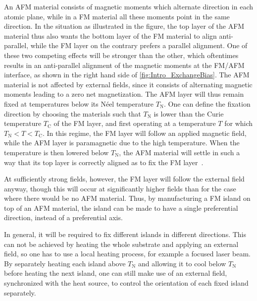 \documentclass[11pt,a4paper,english,twoside]{article}
\begin{document}
An AFM material consists of magnetic moments which alternate direction in each atomic plane, while in a FM material all these moments point in the same direction. In the situation as illustrated in the figure, the top layer of the AFM material thus also wants the bottom layer of the FM material to align anti-parallel, while the FM layer on the contrary prefers a parallel alignment. One of these two competing effects will be stronger than the other, which oftentimes results in an anti-parallel alignment of the magnetic moments at the FM/AFM interface, as shown in the right hand side of \cref{fig:Intro_ExchangeBias}. The AFM material is not affected by external fields, since it consists of alternating magnetic moments leading to a zero net magnetization. The AFM layer will thus remain fixed at temperatures below its N\'{e}el temperature $T_\mathrm{N}$. One can define the fixation direction by choosing the materials such that $T_\mathrm{N}$ is lower than the Curie temperature $T_\mathrm{C}$ of the FM layer, and first operating at a temperature $T$ for which $T_\mathrm{N} < T < T_\mathrm{C}$. In this regime, the FM layer will follow an applied magnetic field, while the AFM layer is paramagnetic due to the high temperature. When the temperature is then lowered below $T_\mathrm{N}$, the AFM material will settle in such a way that its top layer is correctly aligned as to fix the FM layer~\cite{ExchangeBias_Mechanisms}. \par
At sufficiently strong fields, however, the FM layer will follow the external field anyway, though this will occur at significantly higher fields than for the case where there would be no AFM material. Thus, by manufacturing a FM island on top of an AFM material, the island can be made to have a single preferential direction, instead of a preferential axis. \par
In general, it will be required to fix different islands in different directions. This can not be achieved by heating the whole substrate and applying an external field, so one has to use a local heating process, for example a focused laser beam. By separately heating each island above $T_\mathrm{N}$ and allowing it to cool below $T_\mathrm{N}$ before heating the next island, one can still make use of an external field, synchronized with the heat source, to control the orientation of each fixed island separately. \par
\end{document}
